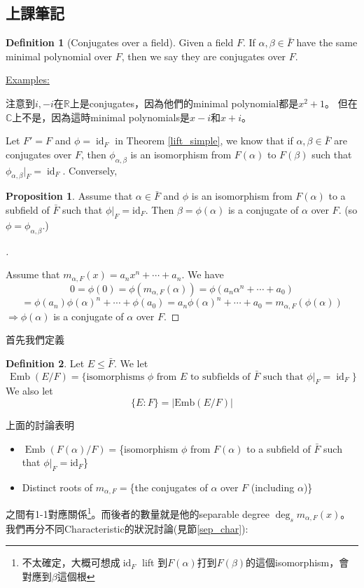 \documentclass[12pt]{article}
\theoremstyle{definition}
\newcommand{\ex}{\noindent\underline{Examples:}}
\newtheorem{dfn}{Definition}
\newtheorem{prop}{Proposition}
\newenvironment{proofs}[1][\proofname]{%
  \begin{proof}[#1]$ $\par\nobreak\ignorespaces
}{%
  \end{proof}
}
\newcommand{\CC}{\mathbb C}
\newcommand{\RR}{\mathbb R}
\DeclareMathOperator{\id}{id}
\DeclareMathOperator{\Emb}{Emb}
\begin{document}
\subsection{上課筆記}

\begin{dfn}[Conjugates over a field]
	Given a field $F$.
	If $\alpha,\beta\in\bar{F}$
	have the same minimal polynomial over $F$, then
	we say they are conjugates over $F$.
\end{dfn}

\ex

注意到$i,-i$在$\RR$上是conjugates，因為他們的minimal polynomial都是$x^2+1$。
但在$\CC$上不是，因為這時minimal polynomials是$x-i$和$x+i$。


Let $F'=F$ and $\phi=\id_F$ in Theorem \ref{lift_simple}, we know that if $\alpha,\beta\in \bar{F}$ are conjugates over $F$, then $\phi_{\alpha,\beta}$ is an isomorphism from $F(\alpha)$ to $F(\beta)$ such that $\phi_{\alpha,\beta}|_F=\id_F$.
Conversely,

\begin{prop}
	Assume that $\alpha \in \bar{F}$ and $\phi$ is an isomorphism from $F(\alpha)$ to a subfield of $\bar{F}$ such that $\phi|_F = \text{id}_F$.
	Then $\beta=\phi(\alpha)$ is a conjugate of $\alpha$ over $F$. (so $\phi = \phi_{\alpha, \beta}$.)
\end{prop}

\begin{proofs}
	Assume that $m_{\alpha, F}(x) = a_n x^n + \cdots + a_n$.
	We have
	\[
		0 = \phi(0) = \phi(m_{\alpha, F}(\alpha)) = \phi(a_n \alpha^n + \cdots + a_0)
	\]
	\[
		= \phi(a_n) \phi(\alpha)^n + \cdots + \phi(a_0) = a_n \phi(\alpha)^n + \cdots + a_0 = m_{\alpha, F}(\phi(\alpha))
	\]
	$\Rightarrow \phi(\alpha)$ is a conjugate of $\alpha$ over $F$.

\end{proofs}

首先我們定義
\begin{dfn}
	Let $E \leq \bar{F}$. We let
	\[
		\Emb(E/F) =\{
		\text{isomorphisms $\phi$ from $E$ to subfields of $\bar{F}$ such that $\phi|_F = \id_F$}
		\}
	\]
	We also let
	\[\{E:F\} = |\text{Emb}(E/F)|\]
\end{dfn}


上面的討論表明
\begin{itemize}
	\item $\Emb(F(\alpha)/F)=$\{isomorphism $\phi$ from $F(\alpha)$ to a subfield of $\bar{F}$ such that $\phi|_F = \text{id}_F$\}
	\item Distinct roots of $m_{\alpha,F}=$\{the conjugates of $\alpha$ over $F$ (including $\alpha$)\}
\end{itemize}
之間有1-1對應關係\footnote{不太確定，大概可想成$\id_F$ lift 到$F(\alpha)$打到$F(\beta)$的這個isomorphism，會對應到$\beta$這個根}。而後者的數量就是他的separable degree $\deg_s m_{\alpha, F}(x)$。我們再分不同Characteristic的狀況討論(見節\ref{sep_char}):
\end{document}
